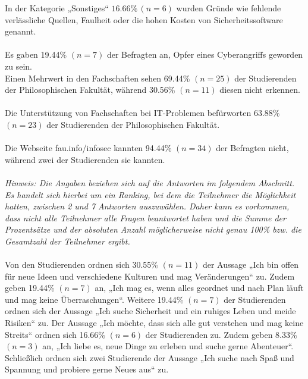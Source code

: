 \documentclass[german,report]{i1thesis}
\begin{document}
In der Kategorie „Sonstiges“ \(16.66\% \,(n = 6)\) wurden Gründe wie fehlende verlässliche Quellen, Faulheit oder die hohen Kosten von Sicherheitssoftware genannt.\\
\\
Es gaben 19.44\% \((n = 7)\) der Befragten an, Opfer eines Cyberangriffs geworden zu sein.
\\
Einen Mehrwert in den Fachschaften sehen 69.44\% \((n = 25)\) der Studierenden der Philosophischen Fakultät, während 30.56\% \((n = 11)\) diesen nicht erkennen.\\
\\
Die Unterstützung von Fachschaften bei IT-Problemen befürworten 63.88\% \((n = 23)\) der Studierenden der Philosophischen Fakultät.\\
\\
Die Webseite fau.info/infosec kannten 94.44\% \((n = 34)\) der Befragten nicht, während zwei der Studierenden sie kannten.\\
\\
\textit{Hinweis: Die Angaben beziehen sich auf die Antworten im folgendem Abschnitt. Es handelt sich hierbei um ein Ranking, bei dem die Teilnehmer die Möglichkeit hatten, zwischen 2 und 7 Antworten auszuwählen. Daher kann es vorkommen, dass nicht alle Teilnehmer alle Fragen beantwortet haben und die Summe der Prozentsätze und der absoluten Anzahl möglicherweise nicht genau 100\% bzw. die Gesamtzahl der Teilnehmer ergibt.}\\
\\
Von den Studierenden ordnen sich 30.55\% \((n = 11)\) der Aussage „Ich bin offen für neue Ideen und verschiedene Kulturen und mag Veränderungen“ zu. Zudem geben 19.44\% \((n = 7)\) an, „Ich mag es, wenn alles geordnet und nach Plan läuft und mag keine Überraschungen“. Weitere 19.44\% \((n = 7)\) der Studierenden ordnen sich der Aussage „Ich suche Sicherheit und ein ruhiges Leben und meide Risiken“ zu. Der Aussage „Ich möchte, dass sich alle gut verstehen und mag keine Streits“ ordnen sich 16.66\% \((n = 6)\) der Studierenden zu. Zudem geben 8.33\% \((n = 3)\) an, „Ich liebe es, neue Dinge zu erleben und suche gerne Abenteuer“. Schließlich ordnen sich zwei Studierende der Aussage „Ich suche nach Spaß und Spannung und probiere gerne Neues aus“ zu.
\end{document}
